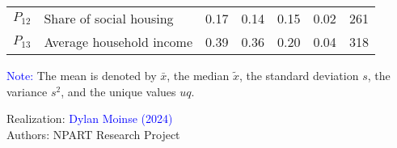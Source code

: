 \begin{table}[h!]
{\begin{tabular}{p{}p{}p{}p{}p{}p{}p{}}
\small{\(P_{12}\)} & \small{Share of social housing} & \small{0.17} & \small{0.14} & \small{0.15} & \small{0.02} & \small{261}\\
\small{\(P_{13}\)} & \small{Average household income} & \small{0.39} & \small{0.36} & \small{0.20} & \small{0.04} & \small{318}\\
        \hline
    \end{tabular}}
    \caption*{}
    \vspace{5pt}
        \begin{flushleft}\scriptsize{
        \textcolor{blue}{Note:} The mean is denoted by \(\bar{x}\), the median \(\tilde{x}\), the standard deviation \(s\), the variance \(s^2\), and the unique values \(uq\).
        }\end{flushleft}
        \begin{flushright}\scriptsize
        Realization: \textcolor{blue}{Dylan Moinse (2024)}
        \\
        Authors: \acrshort{NPART} Research Project
        \end{flushright}
        \end{table}